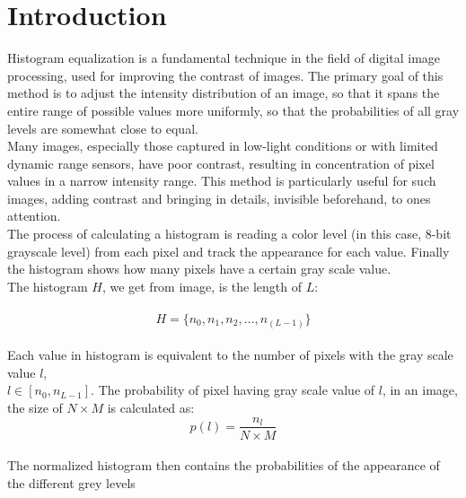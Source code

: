 \documentclass[10pt]{article}
\begin{document}

\tableofcontents
	\thispagestyle{nofooter}
	\cleardoublepage
	\typeout{}

\pagebreak
\setcounter{page}{1}

\section{Introduction}
\label{sec:Introduction}
 Histogram equalization is a fundamental technique in the field of digital image processing, used for improving the contrast of images. The primary goal of this method is to adjust the intensity distribution of an image, so that it spans the entire range of possible values more uniformly, so that the probabilities of all gray levels are somewhat close to equal. 
\\ Many images, especially those captured in low-light conditions or with limited dynamic range sensors, have poor contrast, resulting in concentration of pixel values in a narrow intensity range. This method is particularly useful for such images, adding contrast and bringing in details, invisible beforehand, to ones attention. \\
The process of calculating a histogram is reading a color level (in this case, 8-bit grayscale level) from each pixel and track the appearance for each value. Finally the histogram shows how many pixels have a certain gray scale value.  
\\
The histogram $H$, we get from image, is the length of $L$:
\\
\\
\begin{equation*}
    H = \{n_0, n_1, n_2, \ldots, n_{(L - 1)}\}
\end{equation*}
\\
Each value in histogram is equivalent to the number of pixels with the gray scale value $l$,\\ $l \in [n_0, n_{L-1}]$. The probability of pixel having gray scale value of $l$, in an image, the size of $N \times M$ is calculated as:
\begin{equation*}
    p(l) = \frac{n_l}{N \times M}
\end{equation*}
\\
The normalized histogram then contains the probabilities of the appearance of the different grey levels
\end{document}
